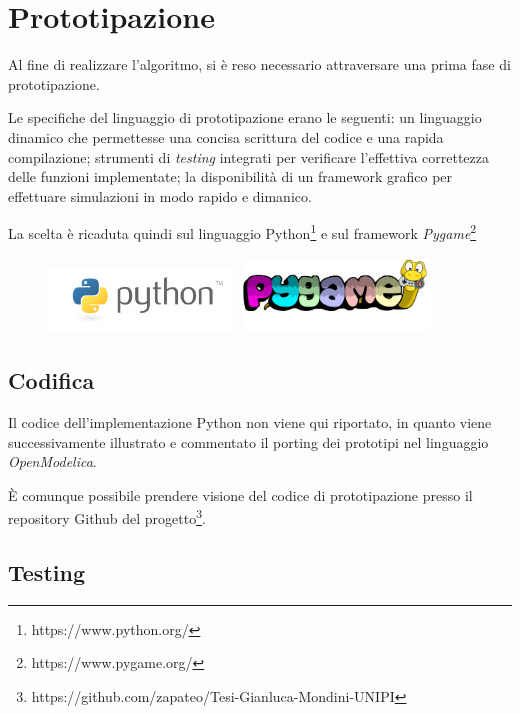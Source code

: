 \documentclass[11pt,a4paper]{report}
\begin{document}
\chapter{Prototipazione}

Al fine di realizzare l'algoritmo, si è reso necessario attraversare una prima fase di prototipazione.

Le specifiche del linguaggio di prototipazione erano le seguenti: un linguaggio dinamico che permettesse una concisa scrittura del codice e una rapida compilazione; strumenti di \textit{testing} integrati per verificare l'effettiva correttezza delle funzioni implementate; la disponibilità di un framework grafico per effettuare simulazioni in modo rapido e dimanico.

La scelta è ricaduta quindi sul linguaggio Python\footnote{https://www.python.org/} e sul framework \textit{Pygame}\footnote{https://www.pygame.org/}

\begin{figure}[H]
\centering
\includegraphics[width=5cm]{python.png}
\includegraphics[width=5cm]{pygame.png}

\end{figure}

\section{Codifica}

Il codice dell'implementazione Python non viene qui riportato, in quanto viene successivamente illustrato e commentato il porting dei prototipi nel linguaggio \textit{OpenModelica}.

È comunque possibile prendere visione del codice di prototipazione presso il repository Github del progetto\footnote{https://github.com/zapateo/Tesi-Gianluca-Mondini-UNIPI}.


\section{Testing}
\end{document}
